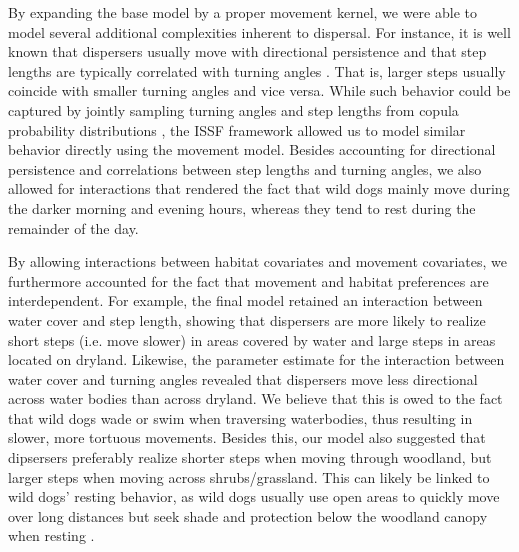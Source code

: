 \documentclass[abstract=on,10pt,a4paper,bibliography=totocnumbered]{article}
\begin{document}
By expanding the base model by a proper movement kernel, we were able to model
several additional complexities inherent to dispersal. For instance, it is well
known that dispersers usually move with directional persistence
\citep{Cozzi.2018, Hofmann.2021} and that step lengths are typically correlated
with turning angles \citep{Morales.2004, Borger.2012}. That is, larger steps
usually coincide with smaller turning angles and vice versa. While such behavior
could be captured by jointly sampling turning angles and step lengths from
copula probability distributions \citep{Hodel.2021}, the ISSF framework allowed
us to model similar behavior directly using the movement model. Besides
accounting for directional persistence and correlations between step lengths and
turning angles, we also allowed for interactions that rendered the fact that
wild dogs mainly move during the darker morning and evening hours, whereas they
tend to rest during the remainder of the day.

By allowing interactions between habitat covariates and movement covariates, we
furthermore accounted for the fact that movement and habitat preferences are
interdependent. For example, the final model retained an interaction between
water cover and step length, showing that dispersers are more likely to realize
short steps (i.e. move slower) in areas covered by water and large steps in
areas located on dryland. Likewise, the parameter estimate for the interaction
between water cover and turning angles revealed that dispersers move less
directional across water bodies than across dryland. We believe that this is
owed to the fact that wild dogs wade or swim when traversing waterbodies, thus
resulting in slower, more tortuous movements. Besides this, our model also
suggested that dipsersers preferably realize shorter steps when moving through
woodland, but larger steps when moving across shrubs/grassland. This can likely
be linked to wild dogs' resting behavior, as wild dogs usually use open areas to
quickly move over long distances \citep{Abrahms.2017} but seek shade and
protection below the woodland canopy when resting \citep{Creel.2002}.
\end{document}
